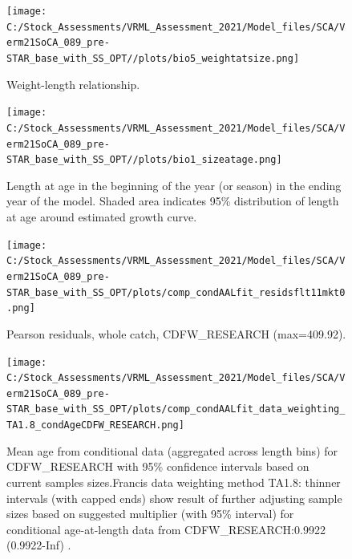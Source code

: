 \documentclass[11pt,
  english,
  a4paper,
]{article}
\begin{document}
\FloatBarrier

\begin{figure}
\centering
\texttt{[image: C:/Stock\_Assessments/VRML\_Assessment\_2021/Model\_files/SCA/Verm21SoCA\_089\_pre-STAR\_base\_with\_SS\_OPT//plots/bio5\_weightatsize.png]}
\caption{Weight-length relationship.\label{fig:weightlength}}
\end{figure}

\begin{figure}
\centering
\texttt{[image: C:/Stock\_Assessments/VRML\_Assessment\_2021/Model\_files/SCA/Verm21SoCA\_089\_pre-STAR\_base\_with\_SS\_OPT//plots/bio1\_sizeatage.png]}
\caption{Length at age in the beginning of the year (or season) in the ending year of the model. Shaded area indicates 95\% distribution of length at age around estimated growth curve.\label{fig:fittedgrowth}}
\end{figure}

\FloatBarrier

\FloatBarrier

\begin{figure}
\centering
\texttt{[image: C:/Stock\_Assessments/VRML\_Assessment\_2021/Model\_files/SCA/Verm21SoCA\_089\_pre-STAR\_base\_with\_SS\_OPT/plots/comp\_condAALfit\_residsflt11mkt0.png]}
\caption{Pearson residuals, whole catch, CDFW\_RESEARCH (max=409.92).\label{fig:comp_condAALfit_residsflt11mkt0}}
\end{figure}

\begin{figure}
\centering
\texttt{[image: C:/Stock\_Assessments/VRML\_Assessment\_2021/Model\_files/SCA/Verm21SoCA\_089\_pre-STAR\_base\_with\_SS\_OPT/plots/comp\_condAALfit\_data\_weighting\_TA1.8\_condAgeCDFW\_RESEARCH.png]}
\caption{Mean age from conditional data (aggregated across length bins) for CDFW\_RESEARCH with 95\% confidence intervals based on current samples sizes.Francis data weighting method TA1.8: thinner intervals (with capped ends) show result of further adjusting sample sizes based on suggested multiplier (with 95\% interval) for conditional age-at-length data from CDFW\_RESEARCH:0.9922 (0.9922-Inf) .\label{fig:comp_condAALfit_data_weighting_TA1.8_condAgeCDFW_RESEARCH}}
\end{figure}
\end{document}
